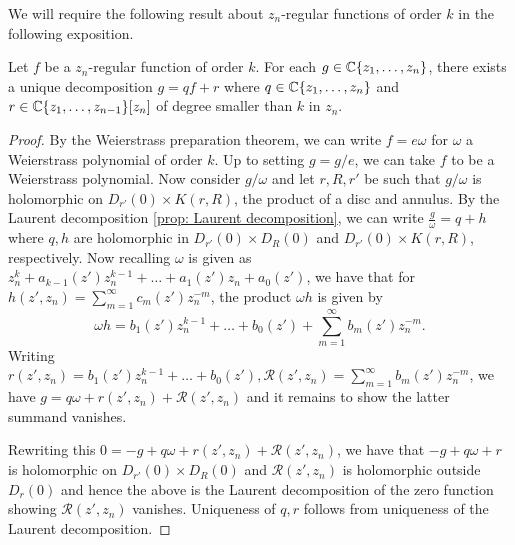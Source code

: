 We will require the following result about $z_{n}$-regular functions of order $k$ in the following exposition. 
\begin{theorem}\label{thm: euclidean division for formal power series}
    Let $f$ be a $z_{n}$-regular function of order $k$. For each $g\in\mathbb{C}\{z_{1},\dots,z_{n}\}$, there exists a unique decomposition $g=qf+r$ where $q\in\mathbb{C}\{z_{1},\dots,z_{n}\}$ and $r\in\mathbb{C}\{z_{1},\dots,z_{n-1}\}[z_{n}]$ of degree smaller than $k$ in $z_{n}$.
\end{theorem}
\begin{proof}
    By the Weierstrass preparation theorem, we can write $f=e\omega$ for $\omega$ a Weierstrass polynomial of order $k$. Up to setting $g=g/e$, we can take $f$ to be a Weierstrass polynomial. Now consider $g/\omega$ and let $r,R,r'$ be such that $g/\omega$ is holomorphic on $D_{r'}(0)\times K(r,R)$, the product of a disc and annulus. By the Laurent decomposition \cref{prop: Laurent decomposition}, we can write $\frac{g}{\omega}=q+h$ where $q,h$ are holomorphic in $D_{r'}(0)\times D_{R}(0)$ and $D_{r'}(0)\times K(r,R)$, respectively. Now recalling $\omega$ is given as $z_{n}^{k}+a_{k-1}(z')z_{n}^{k-1}+\dots+a_{1}(z')z_{n}+a_{0}(z')$, we have that for $h(z',z_{n})=\sum_{m=1}^{\infty}c_{m}(z')z_{n}^{-m}$, the product $\omega h$ is given by
    $$\omega h=b_{1}(z')z_{n}^{k-1}+\dots+b_{0}(z')+\sum_{m=1}^{\infty}b_{m}(z')z_{n}^{-m}.$$
    Writing $r(z',z_{n})=b_{1}(z')z_{n}^{k-1}+\dots+b_{0}(z'),\mathcal{R}(z',z_{n})=\sum_{m=1}^{\infty}b_{m}(z')z_{n}^{-m}$, we have $g=q\omega+r(z',z_{n})+\mathcal{R}(z',z_{n})$ and it remains to show the latter summand vanishes. 

    Rewriting this $0=-g+q\omega+r(z',z_{n})+\mathcal{R}(z',z_{n})$, we have that $-g+q\omega+r$ is holomorphic on $D_{r'}(0)\times D_{R}(0)$ and $\mathcal{R}(z',z_{n})$ is holomorphic outside $D_{r}(0)$ and hence the above is the Laurent decomposition of the zero function showing $\mathcal{R}(z',z_{n})$ vanishes. Uniqueness of $q,r$ follows from uniqueness of the Laurent decomposition. 
\end{proof}